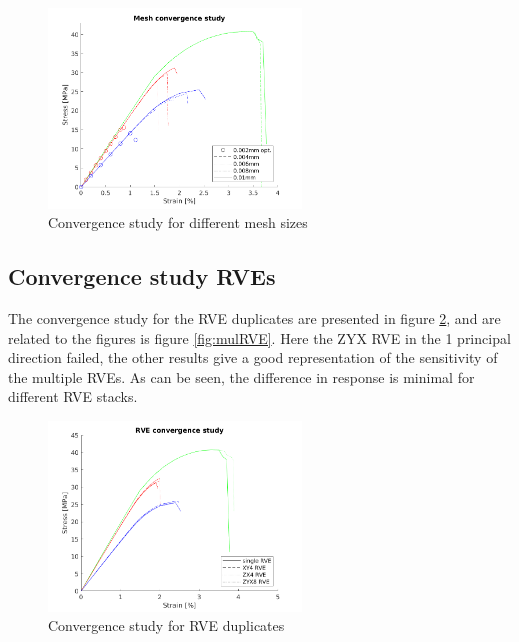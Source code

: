 \begin{figure}[H]
    \centering
    \includegraphics[width=0.60\textwidth]{chapter_7_non-elasticmodelling/figures/meshconv.png}
    \caption{Convergence study for different mesh sizes}
    \label{fig:meshconv}
\end{figure}

\subsection{Convergence study RVEs}
The convergence study for the RVE duplicates are presented in figure \ref{fig:RVEgraph}, and are related to the figures is figure \ref{fig:mulRVE}. Here the ZYX RVE in the 1 principal direction failed, the other results give a good representation of the sensitivity of the multiple RVEs. As can be seen, the difference in response is minimal for different RVE stacks. 

\begin{figure}[H]
    \centering
    \includegraphics[width=0.60\textwidth]{chapter_7_non-elasticmodelling/figures/RVEconv.png}
    \caption{Convergence study for RVE duplicates}
    \label{fig:RVEgraph}
\end{figure}

